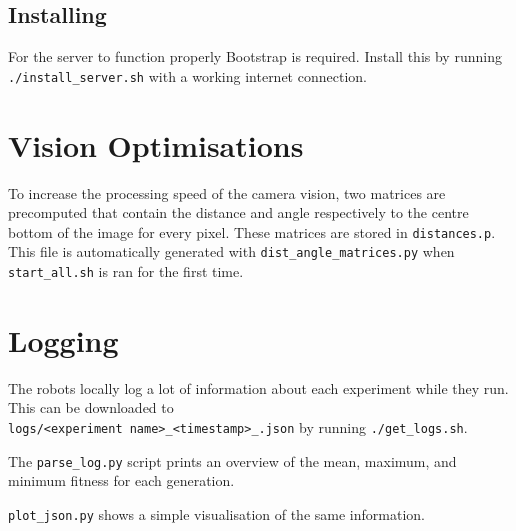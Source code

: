 \documentclass{article}
\begin{document}
	\subsection{Installing} %
	\label{apx:sub:install_server}
	For the server to function properly Bootstrap is required. Install this
	by running \texttt{./install\_server.sh} with a working internet
	connection.

	\section{Vision Optimisations} %
	\label{apx:sec:vision_optimisations}
	To increase the processing speed of the camera vision, two matrices are
	precomputed that contain the distance and angle respectively to the centre
	bottom of the image for every pixel.
	These matrices are stored in \texttt{distances.p}. This file is
	automatically generated with \texttt{dist\_angle\_matrices.py} when
	\texttt{start\_all.sh} is ran for the first time.

	\section{Logging} %
	\label{apx:sec:logging}
	The robots locally log a lot of information about each experiment while
	they run. This can be downloaded to\\\texttt{logs/<experiment
	name>\_<timestamp>\_<git hash>.json} by running \texttt{./get\_logs.sh}.

	The \texttt{parse\_log.py} script prints an overview of the mean, maximum,
	and minimum fitness for each generation.

	\texttt{plot\_json.py} shows a simple visualisation of the same
	information.




\end{document}
